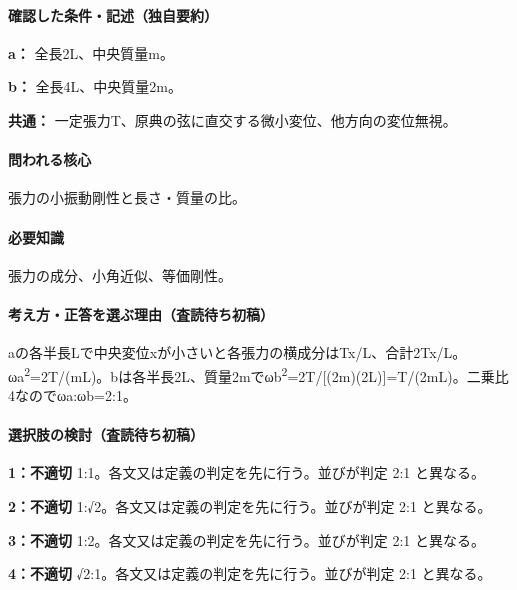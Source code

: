 \paragraph{確認した条件・記述（独自要約）}\mbox{}\par

\noindent\textbf{a：} 全長2L、中央質量m。\par

\noindent\textbf{b：} 全長4L、中央質量2m。\par

\noindent\textbf{共通：} 一定張力T、原典の弦に直交する微小変位、他方向の変位無視。\par

\paragraph{問われる核心} 張力の小振動剛性と長さ・質量の比。

\paragraph{必要知識} 張力の成分、小角近似、等価剛性。

\paragraph{考え方・正答を選ぶ理由（査読待ち初稿）} aの各半長Lで中央変位xが小さいと各張力の横成分はTx/L、合計2Tx/L。ωa\textsuperscript{2}=2T/(mL)。bは各半長2L、質量2mでωb\textsuperscript{2}=2T/[(2m)(2L)]=T/(2mL)。二乗比4なのでωa:ωb=\allowbreak{}2:1。

\paragraph{選択肢の検討（査読待ち初稿）}\mbox{}\par

\noindent\textbf{1：不適切} 1:1。各文又は定義の判定を先に行う。並びが判定 2:1 と異なる。\par

\noindent\textbf{2：不適切} 1:√2。各文又は定義の判定を先に行う。並びが判定 2:1 と異なる。\par

\noindent\textbf{3：不適切} 1:2。各文又は定義の判定を先に行う。並びが判定 2:1 と異なる。\par

\noindent\textbf{4：不適切} √2:1。各文又は定義の判定を先に行う。並びが判定 2:1 と異なる。\par

